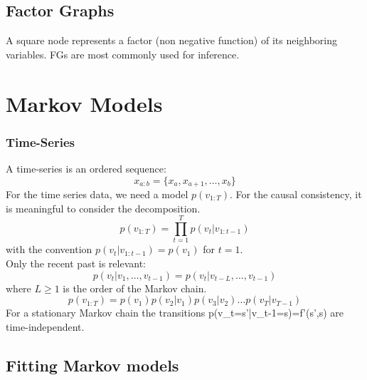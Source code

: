 \documentclass[12pt,a4paper]{article}
\begin{document}
\subsection*{Factor Graphs}
A square node represents a factor (non negative function) of its neighboring variables. FGs are most commonly used for inference.
\section*{Markov Models}
\subsubsection*{Time-Series}
A time-series is an ordered sequence:
$$
x_{a:b}=\{x_a,x_{a+1},\ldots,x_b\}
$$
For the time series data, we need a model $p(v_{1:T})$. For the causal consistency, it is meaningful to consider the decomposition.
$$
p(v_{1:T}) = \prod_{t=1}^{T}p(v_t|v_{1:t-1})
$$
with the convention $p(v_t|v_{1:t-1}) = p(v_1)$ for $t=1$.\\
Only the recent past is relevant:
$$
p(v_t|v_1,\ldots,v_{t-1}) = p(v_t|v_{t-L},\ldots,v_{t-1})
$$
where $L\ge 1$ is the order of the Markov chain.
$$
p(v_{1:T}) = p(v_1)p(v_2|v_1)p(v_3|v_2)\ldots p(v_T|v_{T-1})
$$
For a stationary Markov chain the transitions p(v_t=s'|v_{t-1}=s)=f'(s',s) are time-independent.
\subsection*{Fitting Markov models}
\end{document}
